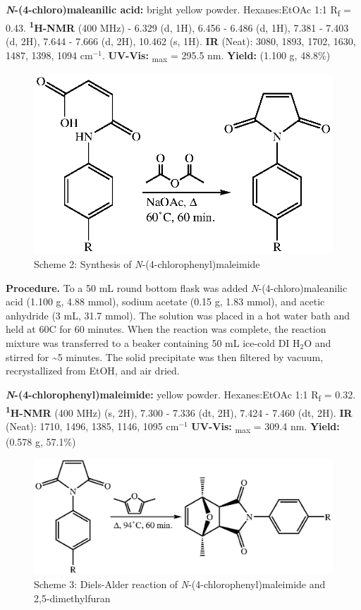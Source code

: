 \documentclass[11pt]{article}
\let\bf\textbf
\begin{document}
\bf{\textit{N}-(4-chloro)maleanilic acid:} bright yellow powder. Hexanes:EtOAc 1:1 R\textsubscript{f} = 0.43. \bf{\textsuperscript{1}H-NMR} (400 MHz) \textdelta{} - 6.329 (d, 1H), 6.456 - 6.486 (d, 1H), 7.381 - 7.403 (d, 2H), 7.644 - 7.666 (d, 2H), 10.462 (s, 1H). \bf{IR} (Neat): 3080, 1893, 1702, 1630, 1487, 1398, 1094 cm$^{-1}$. \bf{UV-Vis:} \textlambda\textsubscript{max} = 295.5 nm. \bf{Yield:} (1.100 g, 48.8\%)

\begin{figure}[H]
    \centering
    \includegraphics[scale=0.8]{schemes/scheme2.eps}
    \caption*{Scheme 2: Synthesis of \textit{N}-(4-chlorophenyl)maleimide}
\end{figure}

\bf{Procedure.} To a 50 mL round bottom flask was added \textit{N}-(4-chloro)maleanilic acid (1.100 g, 4.88 mmol), sodium acetate (0.15 g, 1.83 mmol), and acetic anhydride (3 mL, 31.7 mmol). The solution was placed in a hot water bath and held at 60\degree C for 60 minutes. When the reaction was complete, the reaction mixture was transferred to a beaker containing 50 mL ice-cold DI H$_2$O and stirred for \textasciitilde 5 minutes. The solid precipitate was then filtered by vacuum, recrystallized from EtOH, and air dried.

\bf{\textit{N}-(4-chlorophenyl)maleimide:} yellow powder. Hexanes:EtOAc 1:1 R\textsubscript{f} = 0.32. \bf{\textsuperscript{1}H-NMR} (400 MHz) \textdelta{} (s, 2H), 7.300 - 7.336 (dt, 2H), 7.424 - 7.460 (dt, 2H). \bf{IR} (Neat): 1710, 1496, 1385, 1146, 1095 cm$^{-1}$ \bf{UV-Vis:} \textlambda\textsubscript{max} = 309.4 nm. \bf{Yield:} (0.578 g, 57.1\%)

\begin{figure}[H]
    \centering
    \includegraphics[scale=0.8]{schemes/scheme3.eps}
    \caption*{Scheme 3: Diels-Alder reaction of \textit{N}-(4-chlorophenyl)maleimide and 2,5-dimethylfuran}
\end{figure}
\end{document}
